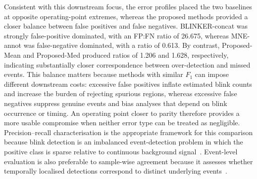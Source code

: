 
Consistent with this downstream focus, the error profiles placed the two baselines at opposite operating-point extremes, whereas the proposed methods provided a closer balance between false positives and false negatives. BLINKER-concat was strongly false-positive dominated, with an FP:FN ratio of 26.675, whereas MNE-annot was false-negative dominated, with a ratio of 0.613. By contrast, Proposed-Mean and Proposed-Med produced ratios of 1.206 and 1.628, respectively, indicating substantially closer correspondence between over-detection and missed events. This balance matters because methods with similar $F_1$ can impose different downstream costs: excessive false positives inflate estimated blink counts and increase the burden of rejecting spurious regions, whereas excessive false negatives suppress genuine events and bias analyses that depend on blink occurrence or timing. An operating point closer to parity therefore provides a more usable compromise when neither error type can be treated as negligible. Precision--recall characterisation is the appropriate framework for this comparison because blink detection is an imbalanced event-detection problem in which the positive class is sparse relative to continuous background signal~\citep{saito2015precision}. Event-level evaluation is also preferable to sample-wise agreement because it assesses whether temporally localised detections correspond to distinct underlying events~\citep{salles2024softed}.

